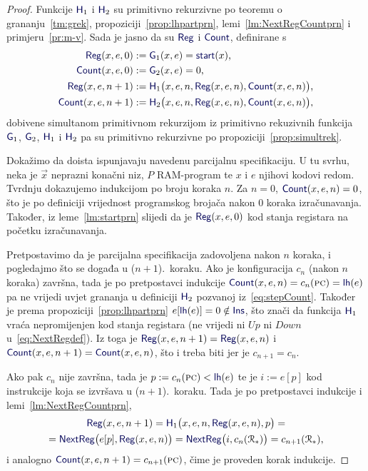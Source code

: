 \begin{proof}
Funkcije $\f H_1$ i $\f H_2$ su primitivno rekurzivne po teoremu o grananju~\ref{tm:grek}, propoziciji~\ref{prop:lhpartprn}, lemi~\ref{lm:NextRegCountprn} i primjeru~\ref{pr:m-v}. Sada je jasno da su $\f{Reg}$ i $\f{Count}$, definirane s
\begin{align}
    \f{Reg}(x,e,0)&:=\f G_1(x,e)=\f{start}(x)\text,\\
    \f{Count}(x,e,0)&:=\f G_2(x,e)=0\text,\\
    \label{eq:stepReg}\f{Reg}(x,e,n+1)&:=\f H_1\bigl(x,e,n,\f{Reg}(x,e,n),\f{Count}(x,e,n)\bigr)\text,\\
    \label{eq:stepCount}\f{Count}(x,e,n+1)&:=\f H_2\bigl(x,e,n,\f{Reg}(x,e,n),\f{Count}(x,e,n)\bigr)\text,
\end{align}
dobivene simultanom primitivnom rekurzijom iz primitivno rekuzivnih funkcija $\f G_1$, $\f G_2$, $\f H_1$ i $\f H_2$ pa su primitivno rekurzivne po propoziciji~\ref{prop:simultrek}.

    Dokažimo da doista ispunjavaju navedenu parcijalnu specifikaciju. U tu svrhu, neka je $\vec x$ neprazni konačni niz, $P$ RAM-program te $x$ i $e$ njihovi kodovi redom. Tvrdnju dokazujemo indukcijom po broju koraka $n$. Za $n=0$, $\f{Count}(x,e,n)=0$, što je po definiciji vrijednost programskog brojača nakon $0$ koraka izračunavanja. Također, iz leme~\ref{lm:startprn} slijedi da je $\f{Reg}(x,e,0)$ kod stanja registara na početku izračunavanja.

Pretpostavimo da je parcijalna specifikacija zadovoljena nakon $n$ koraka, i pogledajmo što se događa u ($n+1$).\ koraku. Ako je konfiguracija $c_n$ (nakon $n$ koraka) završna, tada je po pretpostavci indukcije $\f{Count}(x,e,n)=c_n(\textsc{pc})=\f{lh}(e)$ pa ne vrijedi uvjet grananja u definiciji $\f H_2$ pozvanoj  iz~\eqref{eq:stepCount}. Također je prema propoziciji~\ref{prop:lhpartprn} $e[\f{lh}(e)]=0\notin\f{Ins}$, što znači da funkcija $\f H_1$ vraća nepromijenjen kod stanja registara (ne vrijedi ni $Up$ ni $Down$ u~\eqref{eq:NextRegdef}). Iz toga je $\f{Reg}(x,e,n+1)=\f{Reg}(x,e,n)$ i $\f{Count}(x,e,n+1)=\f{Count}(x,e,n)$, što i treba biti jer je $c_{n+1}=c_n$.

Ako pak $c_n$ nije završna, tada je $p:=c_n(\textsc{pc})<\f{lh}(e)$ te je $i:=e[p]$ kod instrukcije koja se izvršava u ($n+1$).\ koraku. Tada je po pretpostavci indukcije i lemi~\ref{lm:NextRegCountprn},
\begin{multline}
    \f{Reg}(x,e,n+1)=\f H_1\bigl(x,e,n,\f{Reg}(x,e,n),p\bigr)=\\
    =\f{NextReg}\bigl(e[p],\f{Reg}(x,e,n)\bigr)=\f{NextReg}\bigl(i,c_n(\reg{*})\bigr)=c_{n+1}(\reg{*})\text,
\end{multline}
i analogno $\f{Count}(x,e,n+1)=c_{n+1}(\textsc{pc})$, čime je proveden korak indukcije.
\end{proof}


